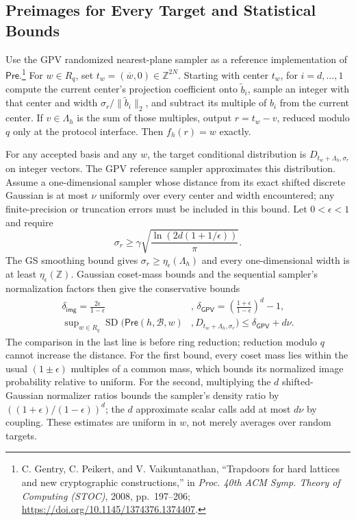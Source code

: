 \documentclass[lettersize,journal]{IEEEtran}
\begin{document}
	\subsection{Preimages for Every Target and Statistical Bounds}
	\label{par:blue-preimage-contract}
	Use the GPV randomized nearest-plane sampler as a reference
	implementation of $\mathsf{Pre}$.\footnote{C. Gentry, C. Peikert, and
		V. Vaikuntanathan, ``Trapdoors for hard lattices and new cryptographic
		constructions,'' in \emph{Proc. 40th ACM Symp. Theory of Computing
		(STOC)}, 2008, pp.~197--206;
		\url{https://doi.org/10.1145/1374376.1374407}.}
	For $w\in R_q$, set $t_w=(\overline w,0)\in\mathbb Z^{2N}$.
	Starting with center $t_w$, for $i=d,\ldots,1$ compute the current
	center's projection coefficient onto $\widetilde b_i$, sample an integer
	with that center and width $\sigma_r/\|\widetilde b_i\|_2$, and subtract
	its multiple of $b_i$ from the current center. If $v\in\Lambda_h$ is
	the sum of those multiples, output $r=t_w-v$, reduced modulo $q$ only
	at the protocol interface. Then $f_h(r)=w$ exactly.
	
	For any accepted basis and any $w$, the target conditional distribution is
	$D_{t_w+\Lambda_h,\sigma_r}$ on integer vectors. The GPV reference sampler approximates this distribution. Assume a one-dimensional
	sampler whose distance from its exact shifted discrete Gaussian is at
	most $\nu$ uniformly over every center and width encountered; any
	finite-precision or truncation errors must be included in this bound.
	Let $0<\epsilon<1$ and require
	\[
	\sigma_r\geq\gamma
	\sqrt{\frac{\ln(2d(1+1/\epsilon))}{\pi}}.
	\]
	The GS smoothing bound gives
	$\sigma_r\geq\eta_\epsilon(\Lambda_h)$ and every one-dimensional
	width is at least $\eta_\epsilon(\mathbb Z)$. Gaussian coset-mass
	bounds and the sequential sampler's normalization factors then give
	the conservative bounds
	\[
	\begin{aligned}
		\delta_{\mathsf{img}}=\frac{2\epsilon}{1-\epsilon}&,\,
		\delta_{\mathsf{GPV}}=\left(\frac{1+\epsilon}{1-\epsilon}\right)^d-1,\\
		\sup\nolimits_{w\in R_q}\operatorname{SD}\bigl(
		\mathsf{Pre}(h,\mathcal B,w)&,
		D_{t_w+\Lambda_h,\sigma_r}\bigr)
		\leq\delta_{\mathsf{GPV}}+d\nu.
	\end{aligned}
	\]
	The comparison in the last line is before ring reduction; reduction
	modulo $q$ cannot increase the distance. For the first bound, every
	coset mass lies within the usual $(1\pm\epsilon)$ multiples of a
	common mass, which bounds its normalized image probability relative
	to uniform. For the second, multiplying the $d$ shifted-Gaussian
	normalizer ratios bounds the sampler's density ratio by
	$((1+\epsilon)/(1-\epsilon))^d$; the $d$ approximate scalar calls
	add at most $d\nu$ by coupling. These estimates are uniform in $w$,
	not merely averages over random targets.
	
\end{document}
